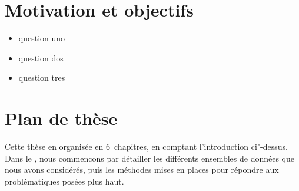 \section{Motivation et objectifs}
\label{sec:problematique}

\begingroup
{}
\begin{itemize}
        \setlength{\topsep}{\baselineskip}
        \setlength{\itemsep}{\baselineskip}
        \renewcommand*\labelitemi{\adfrightarrowhead}
  \item question uno
  \item question dos
  \item question tres
\end{itemize}
\endgroup

\section{Plan de thèse}
\label{sec:plan-de-these}

Cette thèse en organisée en 6~chapitres, en comptant l'introduction ci"-dessus.
Dans le , nous commencons par détailler les différents ensembles de données que nous avons considérés, puis les méthodes mises en places pour répondre aux problématiques posées plus haut.
